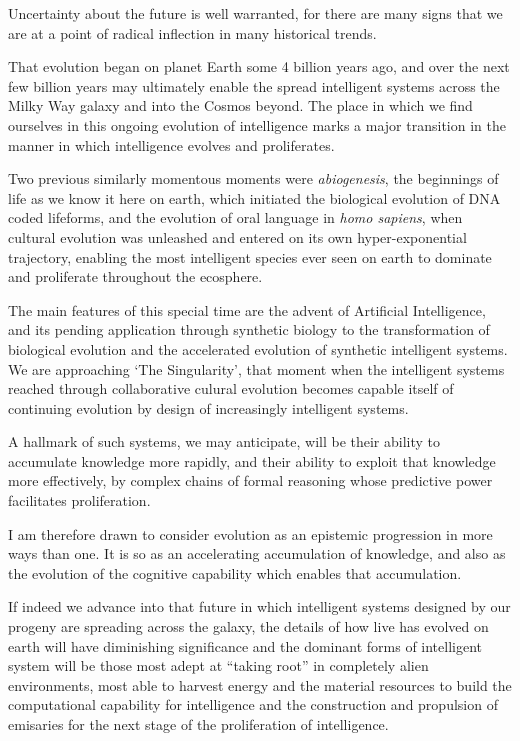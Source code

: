 \documentclass[10pt,titlepage]{book}
\begin{document}
Uncertainty about the future is well warranted, for there are many signs that we are at a point of radical inflection in many historical trends.

That evolution began on planet Earth some 4 billion years ago, and over the  next few billion years may ultimately enable the spread intelligent systems across the Milky Way galaxy and into the Cosmos beyond.
The place in which we find ourselves in this ongoing evolution of intelligence marks a major transition in the manner in which intelligence evolves and proliferates.

Two previous similarly momentous moments were \emph{abiogenesis}, the beginnings of life as we know it here on earth, which initiated the biological evolution of DNA coded lifeforms, and the evolution of oral language in \emph{homo sapiens}, when cultural evolution was unleashed and entered on its own hyper-exponential trajectory, enabling the most intelligent species ever seen on earth to dominate and proliferate throughout the ecosphere.

The main features of this special time are the advent of Artificial Intelligence, and its pending application through synthetic biology to the transformation of biological evolution and the accelerated evolution of synthetic intelligent systems.
We are approaching `The Singularity', that moment when the intelligent systems reached through collaborative culural evolution becomes capable itself of continuing evolution by design of increasingly intelligent systems.

A hallmark of such systems, we may anticipate, will be their ability to accumulate knowledge more rapidly, and their ability to exploit that knowledge more effectively, by complex chains of formal reasoning whose predictive power facilitates proliferation.

I am therefore drawn to consider evolution as an epistemic progression in more ways than one.
It is so as an accelerating accumulation of knowledge, and also as the evolution of the cognitive capability which enables that accumulation.

If indeed we advance into that future in which intelligent systems designed by our progeny are spreading across the galaxy, the details of how live has evolved on earth will have diminishing significance and the dominant forms of intelligent system will be those most adept at ``taking root'' in completely alien environments, most able to harvest energy and the material resources to build the computational capability for intelligence and the construction and propulsion of emisaries for the next stage of the proliferation of intelligence.
\end{document}
